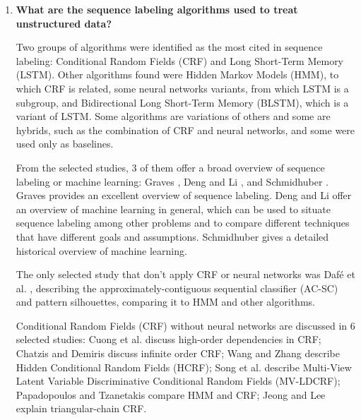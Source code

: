 \newpage
\begin{enumerate}[listparindent=\parindent,itemindent=\parindent,label=\textbf{RQ\arabic*.}]
\item   \textbf{What are the sequence labeling algorithms used to treat unstructured data?}

Two groups of algorithms were identified as the most cited in sequence labeling: Conditional Random Fields (CRF) and Long Short-Term Memory (LSTM). 
Other algorithms found were Hidden Markov Models (HMM), to which CRF is related, some neural networks variants, from which LSTM is a subgroup, and Bidirectional Long Short-Term Memory (BLSTM), which is a variant of LSTM. 
Some algorithms are variations of others and some are hybrids, such as the combination of CRF and neural networks, and some were used only as baselines.

From the selected studies,
3 of them offer a broad overview of sequence labeling or machine learning: Graves \cite{graves_supervised_2012}, Deng and Li \cite{deng_machine_2013}, and Schmidhuber \cite{schmidhuber_deep_2015}.
    Graves \cite{graves_supervised_2012} provides an excellent overview of sequence labeling.
    Deng and Li \cite{deng_machine_2013} offer an overview of machine learning in general, which can be used to situate sequence labeling among other problems and to compare different techniques that have different goals and assumptions. 
    Schmidhuber \cite{schmidhuber_deep_2015} gives a detailed historical overview of machine learning.

The only selected study that don't apply CRF or neural networks was Daf{\'e} et al. \cite{dafe_learning_2015}, describing the approximately-contiguous sequential classifier (AC-SC) and pattern silhouettes, comparing it to HMM and other algorithms.

    
Conditional Random Fields (CRF) without neural networks are discussed in 
6 selected studies:
    Cuong et al. \cite{cuong_conditional_2014} discuss high-order dependencies in CRF;
    Chatzis and Demiris \cite{chatzis_infinite-order_2013} discuss infinite order CRF;
    Wang and Zhang \cite{wang_ica_2013} describe Hidden Conditional Random Fields (HCRF);
    Song et al. \cite{song_multi-view_2012} describe Multi-View Latent Variable Discriminative Conditional Random Fields (MV-LDCRF);
    Papadopoulos and Tzanetakis \cite{papadopoulos_models_2017} compare HMM and CRF;
    Jeong and Lee \cite{jeong_triangular-chain_2008} explain triangular-chain CRF.


\end{enumerate}
